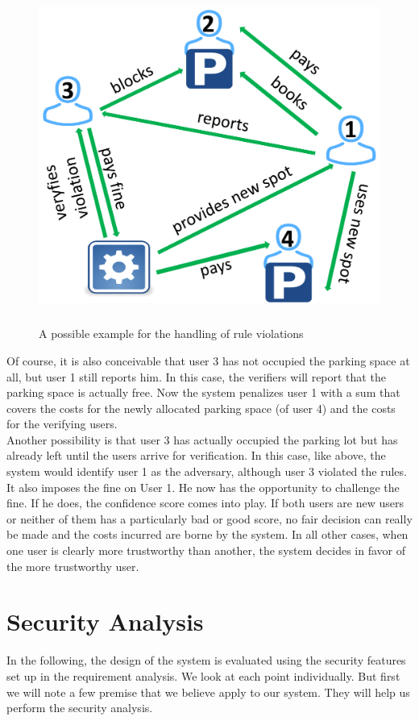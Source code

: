 \documentclass[
a4paper,     %
titlepage,   %
14pt         %
]{scrartcl}  %
\theoremstyle{mystyle}
\begin{document}
\begin{figure}
	\centering
	\includegraphics[width=13cm,height=11cm]{example_grafik.pdf}
	\caption{A possible example for the handling of rule violations}
	\label{img:example-grafik}
\end{figure}
 
Of course, it is also conceivable that user 3 has not occupied the parking space at all, but user 1 still reports him. In this case, the verifiers will report that the parking space is actually free. Now the system penalizes user 1 with a sum that covers the costs for the newly allocated parking space (of user 4) and the costs for the verifying users.\\

Another possibility is that user 3 has actually occupied the parking lot but has already left until the users arrive for verification. In this case, like above, the system would identify user 1 as the adversary, although user 3 violated the rules. It also imposes the fine on User 1. He now has the opportunity to challenge the fine. If he does, the confidence score comes into play. If both users are new users or neither of them has a particularly bad or good score, no fair decision can really be made and the costs incurred are borne by the system. In all other cases, when one user is clearly more trustworthy than another, the system decides in favor of the more trustworthy user.


\section{Security Analysis}
In the following, the design of the system is evaluated using the security features set up in the requirement analysis. We look at each point individually. But first we will note a few premise that we believe apply to our system. They will help us perform the security analysis.
\end{document}
